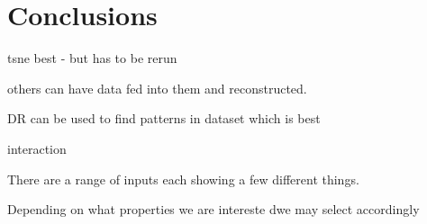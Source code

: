 \section{Conclusions}

tsne best - but has to be rerun 

others can have data fed into them and reconstructed. 




DR can be used to find patterns in dataset
which is best

interaction

There are a range of inputs
each showing a few different things.

Depending on what properties we are intereste dwe may select accordingly
